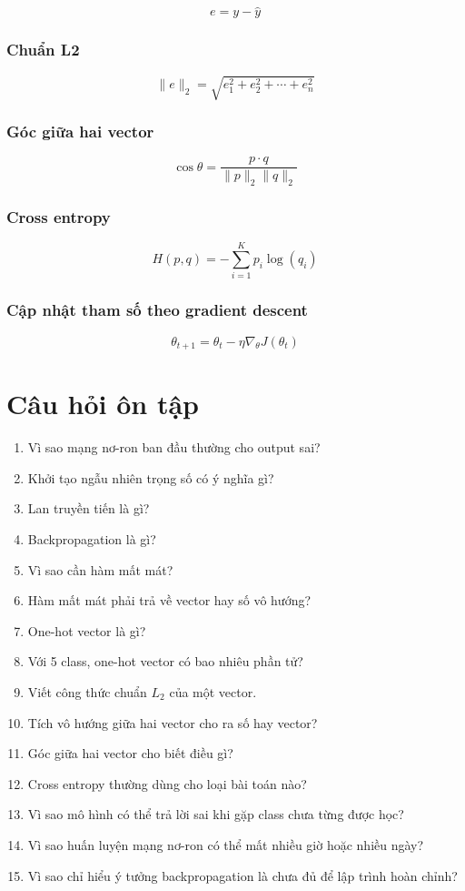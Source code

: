 \documentclass[12pt,a4paper]{report}
\begin{document}
\[
    e = y-\hat{y}
\]

\subsection*{Chuẩn L2}

\[
    \|e\|_2 = \sqrt{e_1^2+e_2^2+\cdots+e_n^2}
\]

\subsection*{Góc giữa hai vector}

\[
    \cos\theta =
    \frac{p\cdot q}{\|p\|_2\|q\|_2}
\]

\subsection*{Cross entropy}

\[
    H(p,q)=-\sum_{i=1}^{K}p_i\log(q_i)
\]

\subsection*{Cập nhật tham số theo gradient descent}

\[
    \theta_{t+1}=\theta_t-\eta\nabla_{\theta}J(\theta_t)
\]

\chapter{Câu hỏi ôn tập}

\begin{enumerate}
    \item Vì sao mạng nơ-ron ban đầu thường cho output sai?
    \item Khởi tạo ngẫu nhiên trọng số có ý nghĩa gì?
    \item Lan truyền tiến là gì?
    \item Backpropagation là gì?
    \item Vì sao cần hàm mất mát?
    \item Hàm mất mát phải trả về vector hay số vô hướng?
    \item One-hot vector là gì?
    \item Với 5 class, one-hot vector có bao nhiêu phần tử?
    \item Viết công thức chuẩn $L_2$ của một vector.
    \item Tích vô hướng giữa hai vector cho ra số hay vector?
    \item Góc giữa hai vector cho biết điều gì?
    \item Cross entropy thường dùng cho loại bài toán nào?
    \item Vì sao mô hình có thể trả lời sai khi gặp class chưa từng được học?
    \item Vì sao huấn luyện mạng nơ-ron có thể mất nhiều giờ hoặc nhiều ngày?
    \item Vì sao chỉ hiểu ý tưởng backpropagation là chưa đủ để lập trình hoàn chỉnh?
\end{enumerate}
\end{document}
